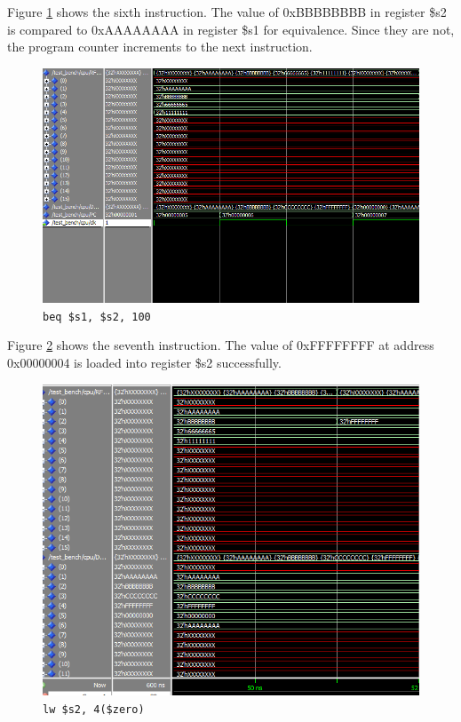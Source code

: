 \documentclass[12pt]{article}
\begin{document}
Figure \ref{fig:6-instr} shows the sixth instruction. The value of 0xBBBBBBBB in register \$s2 is compared to 0xAAAAAAAA in register \$s1 for equivalence. Since they are not, the program counter increments to the next instruction.
\begin{figure}[H]
\centering
\includegraphics[width=\linewidth]{simulation/6-instr}
\caption{\texttt{beq \$s1, \$s2, 100}}
\label{fig:6-instr}
\end{figure}


Figure \ref{fig:7-instr} shows the seventh instruction. The value of 0xFFFFFFFF at address 0x00000004 is loaded into register \$s2 successfully.
\begin{figure}[H]
\centering
\includegraphics[width=\linewidth]{simulation/7-instr}
\caption{\texttt{lw \$s2, 4(\$zero)}}
\label{fig:7-instr}
\end{figure}
\end{document}
